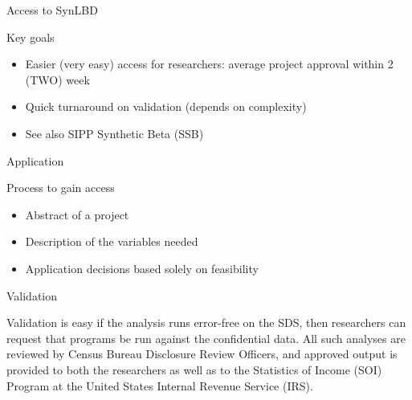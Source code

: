 \begin{frame}{Access to SynLBD}
\begin{block}{Key goals}
\begin{itemize}
\item Easier (very easy) access for researchers: average project approval within 2 (TWO) week
\item Quick turnaround on validation (depends on complexity)
\item See also SIPP Synthetic Beta (SSB)
\end{itemize}
\end{block}
\end{frame}


\begin{frame}{Application}
\begin{block}{Process to gain access}
\begin{itemize}
\item Abstract of a project
\item Description of the variables needed 
\item Application decisions  based solely on feasibility
\end{itemize}
\end{block}
\end{frame}




\begin{frame}{Validation}
\begin{block}{Validation is easy}
if the analysis runs error-free on the SDS, then researchers can request that programs be run against the confidential data. All such analyses are reviewed by Census Bureau Disclosure Review Officers, and approved output is provided to both the researchers as well as to the Statistics of Income (SOI) Program at the United States Internal Revenue Service (IRS).
\end{block}
\end{frame}


